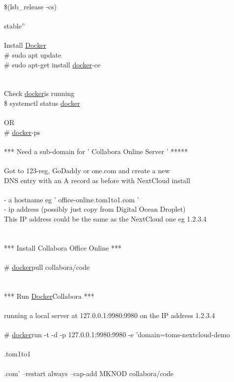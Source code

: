 \documentclass[10pt,a4paper]{article}
\begin{document}
{   	\$(lsb\_release -cs) \\\\
   	stable''\\
\\
	Install \hyperlink{docker}{Docker}}{\large \\
	\# sudo apt update\\
	\# sudo apt-get install \hyperlink{docker}{docker}}{\large -ce\\
\\
\\
	Check \hyperlink{docker}{docker}}{\large  is running\\
	\$ systemctl status \hyperlink{docker}{docker}}{\large \\
\\
	OR\\
	\# \hyperlink{docker}{docker}}{\large  -ps\\
\\
*** Need a sub-domain for ' Collabora Online Server ' *****\\
\\
	Got to 123-reg, GoDaddy or one.com and create a new \\
	DNS entry with an A record as before with NextCloud install\\
\\
	- a hostname eg  ' office-online.tom1to1.com '\\
	- ip address  (possibly just copy from Digital Ocean Droplet)\\
	This IP address could be the same as the NextCloud one eg 1.2.3.4\\
\\
\\
*** Install Collabora Office Online ***\\
\\
	\# \hyperlink{docker}{docker}}{\large  pull collabora/code\\
\\
\\
*** Run \hyperlink{docker}{Docker}}{\large  Collabora ***\\
\\
	running a local server at 127.0.0.1:9980:9980 on the IP address 1.2.3.4  \\
\\
	\# \hyperlink{docker}{docker}}{\large  run -t -d -p 127.0.0.1:9980:9980 -e 'domain=toms-nextcloud-demo\\\\.tom1to1\\\\.com' --restart always --cap-add MKNOD collabora/code\\
}
\end{document}
